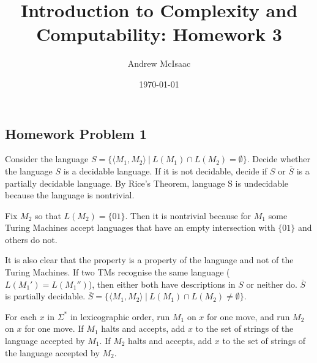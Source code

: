 \documentclass{article}
\author{Andrew McIsaac}
\title{Introduction to Complexity and Computability: Homework 3}
\date{\today}
\begin{document}
\maketitle

\subsection*{Homework Problem 1}

Consider the language $S = \{\langle M_1, M_2\rangle~|~L(M_1) \cap L(M_2) = \emptyset\}$.
Decide whether the language $S$ is a decidable language. If it is not decidable,
decide if $S$ or $\bar{S}$ is a partially decidable language.
\newline
\newline
By Rice's Theorem, language S is undecidable because the language is nontrivial.

Fix $M_2$ so that $L(M_2) = \{01\}$. Then it is nontrivial because for $M_1$ some Turing Machines
accept languages that have an empty intersection with $\{01\}$ and others do not.

It is also clear that the property is a property of the language and not of the 
Turing Machines. If two TMs recognise the same language ($L(M_1') = L(M_1'')$),
then either both have descriptions in $S$ or neither do.
%
\newline
\newline
$\bar{S}$ is partially decidable. $\bar{S} = \{\langle M_1, M_2\rangle~|~
L(M_1) \cap L(M_2) \neq \emptyset\}$.

For each $x$ in $\Sigma^*$ in lexicographic order, run $M_1$ on $x$ for one move,
and run $M_2$ on $x$ for one move.
If $M_1$ halts and accepts, add $x$ to the set of strings of the language accepted by $M_1$.
If $M_2$ halts and accepts, add $x$ to the set of strings of the language accepted by $M_2$.
\end{document}
